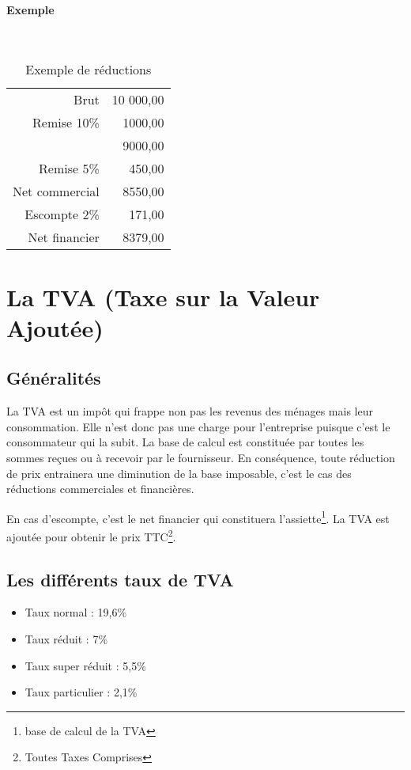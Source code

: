 \documentclass[11pt]{article}
\begin{document}
			\paragraph{Exemple}~\\
				\begin{table}[H]
					\begin{center}
						\begin{tabular}{rr}
							Brut & 10 000,00 \\
							Remise 10\% & 1000,00 \\
							\cline{2-2} & 9000,00\\
							Remise 5\% & 450,00 \\
							\cline{2-2} Net commercial & 8550,00 \\
							Escompte 2\% & 171,00 \\
							\cline{2-2} Net financier & 8379,00
						\end{tabular}
					\end{center}
					\caption{Exemple de réductions}
				\end{table}

	\section{La TVA (Taxe sur la Valeur Ajoutée)}
		\subsection{Généralités}
			La TVA est un impôt qui frappe non pas les revenus des ménages mais leur consommation. Elle n'est donc pas une charge pour l'entreprise puisque c'est le consommateur qui la subit. La base de calcul est constituée par toutes les sommes reçues ou à recevoir par le fournisseur. En conséquence, toute réduction de prix entrainera une diminution de la base imposable, c'est le cas des réductions commerciales et financières.
			
			En cas d'escompte, c'est le net financier qui constituera l'assiette\footnote{base de calcul de la TVA}. La TVA est ajoutée pour obtenir le prix TTC\footnote{Toutes Taxes Comprises}.
			
		\subsection{Les différents taux de TVA}
			\begin{itemize}
				\item Taux normal : 19,6\%
				\item Taux réduit : 7\%
				\item Taux super réduit : 5,5\%
				\item Taux particulier : 2,1\%
			\end{itemize}
			
\end{document}

